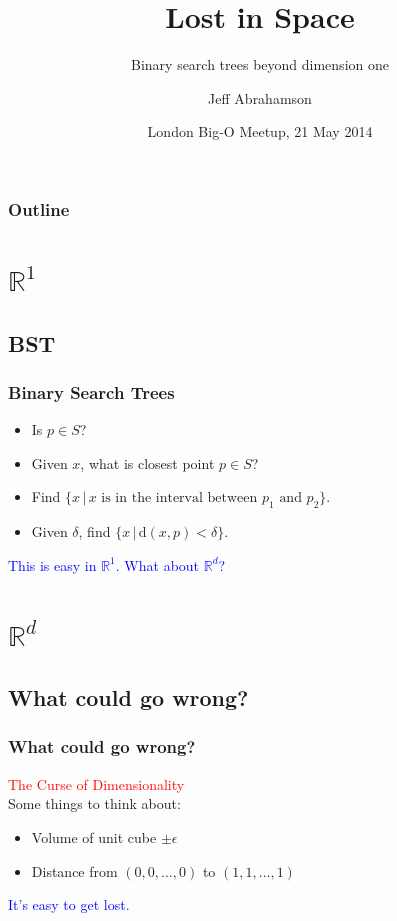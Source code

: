 \documentclass{beamer}
\title[Lost!] %
{Lost in Space}
\subtitle{Binary search trees beyond dimension one}
\author[Abrahamson]
{Jeff Abrahamson}
\institute[Google]{Google, Inc.}
\date[Big-O Meetup]
{London Big-O Meetup, 21 May 2014}
\begin{document}

\begin{frame}
  \titlepage
\end{frame}

\begin{frame}
  \frametitle{Outline}
  \tableofcontents[pausesections]
\end{frame}

\section{$\mathbb{R}^1$}
\subsection{BST}

\begin{frame}
  \frametitle{Binary Search Trees}
  \begin{itemize}
  \item Is $p\in S$?
  \item Given $x$, what is closest point $p\in S$?
  \item Find $\{x\,|\,x \textrm{ is in the interval between } p_1 \textrm{ and } p_2\}$.
  \item Given $\delta$, find $\{x\,|\,\mathrm{d}(x,p) < \delta\}$.
  \end{itemize}
  \pause
  \bigskip
  \textcolor{blue}{This is easy in $\mathbb{R}^1$.  What about $\mathbb{R}^d$?}
\end{frame}

\section{$\mathbb{R}^d$}
\subsection{What could go wrong?}

\begin{frame}
  \frametitle{What could go wrong?}
  \textcolor{red}{The Curse of Dimensionality}\\
  \bigskip
  \pause
  Some things to think about:
  \begin{itemize}
  \item Volume of unit cube $\pm\epsilon$
  \item Distance from $(0,0,\ldots,0)$ to $(1,1,\ldots,1)$
  \end{itemize}
  \pause
  \bigskip
  \textcolor{blue}{It's easy to get lost.}
\end{frame}
\end{document}
